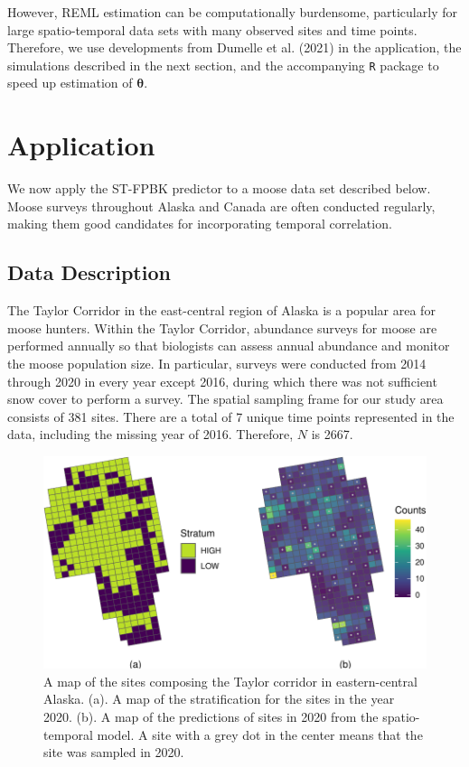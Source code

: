 \documentclass[smallextended]{svjour3}       %
\begin{document}
However, REML estimation can be computationally burdensome, particularly
for large spatio-temporal data sets with many observed sites and time
points. Therefore, we use developments from Dumelle et al. (2021) in the
application, the simulations described in the next section, and the
accompanying \texttt{R} package to speed up estimation of
\(\bm{\theta}\).

\hypertarget{section:Application}{%
\section{Application}\label{section:Application}}

We now apply the ST-FPBK predictor to a moose data set described below.
Moose surveys throughout Alaska and Canada are often conducted
regularly, making them good candidates for incorporating temporal
correlation.

\hypertarget{data-description}{%
\subsection{Data Description}\label{data-description}}

The Taylor Corridor in the east-central region of Alaska is a popular
area for moose hunters. Within the Taylor Corridor, abundance surveys
for moose are performed annually so that biologists can assess annual
abundance and monitor the moose population size. In particular, surveys
were conducted from 2014 through 2020 in every year except 2016, during
which there was not sufficient snow cover to perform a survey. The
spatial sampling frame for our study area consists of 381 sites. There
are a total of 7 unique time points represented in the data, including
the missing year of 2016. Therefore, \(N\) is 2667.

\begin{figure}
\centering
\includegraphics{preprint_springer_files/figure-latex/unnamed-chunk-7-1.pdf}
\caption{\label{fig:sitepredmap} A map of the sites composing the Taylor
corridor in eastern-central Alaska. (a). A map of the stratification for
the sites in the year 2020. (b). A map of the predictions of sites in
2020 from the spatio-temporal model. A site with a grey dot in the
center means that the site was sampled in 2020.}
\end{figure}
\end{document}
